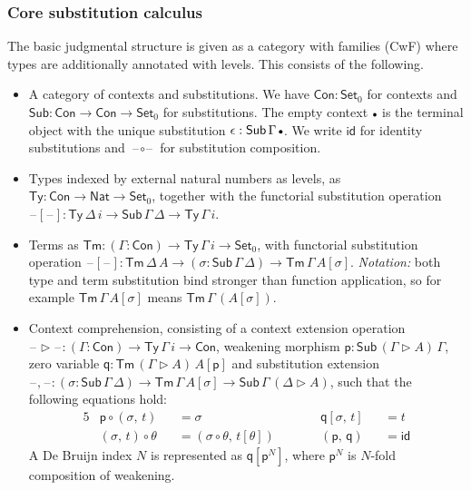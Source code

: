 \documentclass[acmsmall,screen,review]{acmart}
\newcommand{\msf}[1]{{\mathsf{#1}}}
\newcommand{\p}{\mathsf{p}}
\newcommand{\q}{\mathsf{q}}
\newcommand{\Set}{\msf{Set}}
\newcommand{\Nat}{\msf{Nat}}
\newcommand{\blank}{{\mathord{\hspace{1pt}\text{--}\hspace{1pt}}}}
\newcommand{\emptycon}{\scaleobj{.75}\bullet}
\newcommand{\id}{\msf{id}}
\newcommand{\Con}{\msf{Con}}
\newcommand{\Sub}{\msf{Sub}}
\newcommand{\Ty}{\msf{Ty}}
\newcommand{\Tm}{\msf{Tm}}
\newcommand{\ext}{\triangleright}
\begin{document}
\subsubsection{Core substitution calculus} The basic judgmental structure is given
as a category with families (CwF) \cite{Dybjer96internaltype,cwfs} where types are additionally
annotated with levels. This consists of the following.
\begin{itemize}
\item A category of contexts and substitutions. We have $\Con : \Set_0$ for contexts and $\Sub : \Con \to \Con \to \Set_0$
  for substitutions. The empty context $\emptycon$ is the terminal object with the unique substitution $\epsilon : \Sub\,\Gamma\,\emptycon$.
  We write $\id$ for identity substitutions and $\blank\!\circ\!\blank$ for substitution composition.
\item Types indexed by external natural numbers as levels, as $\Ty : \Con \to \Nat \to \Set_0$,
  together with the functorial substitution operation $\blank[\blank] : \Ty\,\Delta\,i \to
  \Sub\,\Gamma\,\Delta \to \Ty\,\Gamma\,i$.
\item Terms as $\Tm : (\Gamma : \Con) \to \Ty\,\Gamma\,i \to \Set_0$, with functorial substitution operation
  $\blank[\blank] : \Tm\,\Delta\,A \to (\sigma : \Sub\,\Gamma\,\Delta) \to \Tm\,\Gamma\,A[\sigma]$.
  \emph{Notation:} both type and term substitution bind stronger than function application, so
  for example $\Tm\,\Gamma\,A[\sigma]$ means $\Tm\,\Gamma\,(A[\sigma])$.
\item Context comprehension, consisting of a context extension operation $\blank\!\ext\!\blank : (\Gamma : \Con) \to \Ty\,\Gamma\,i \to \Con$,
  weakening morphism $\p : \Sub\,(\Gamma\ext A)\,\Gamma$, zero variable $\q : \Tm\,(\Gamma\ext A)\,A[\p]$ and substitution extension $\blank,\!\blank : (\sigma : \Sub\,\Gamma\,\Delta) \to \Tm\,\Gamma\,A[\sigma] \to \Sub\,\Gamma\,(\Delta\ext A)$, such that the following equations hold:
  \begin{alignat*}{5}
    &\p \circ (\sigma,\,t)     &&= \sigma                             &&\q[\sigma,\,t] &&= t\\
    &(\sigma,\,t) \circ \theta &&= (\sigma \circ \theta,\,t[\theta])\hspace{2em} && (\p,\,\q) &&= \id
  \end{alignat*}
  A De Bruijn index $N$ is represented as $\q[\p^N]$, where $\p^N$ is $N$-fold composition
  of weakening.
\end{itemize}
\end{document}

